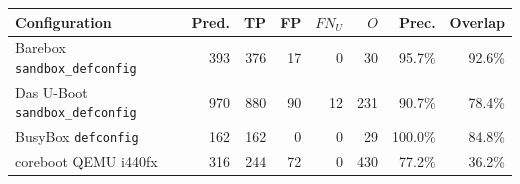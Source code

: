 \begin{tabular}{lrrrrrrr}
\toprule
Configuration & Pred. & TP & FP & $FN_U$ & $O$ & Prec. & Overlap \\
\midrule
Barebox \texttt{sandbox\_defconfig} & 393 & 376 & 17 & 0 & 30 & 95.7\% & 92.6\% \\
Das U-Boot \texttt{sandbox\_defconfig} & 970 & 880 & 90 & 12 & 231 & 90.7\% & 78.4\% \\
BusyBox \texttt{defconfig} & 162 & 162 & 0 & 0 & 29 & 100.0\% & 84.8\% \\
coreboot QEMU i440fx & 316 & 244 & 72 & 0 & 430 & 77.2\% & 36.2\% \\
\bottomrule
\end{tabular}
